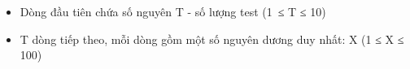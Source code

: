 \begin{itemize}
	\item     Dòng đầu tiên chứa số nguyên T - số lượng test (1 ≤ T ≤ 10)   
	\item     T dòng tiếp theo, mỗi dòng gồm một số nguyên dương duy nhất: X (1 ≤ X ≤ 100)   
\end{itemize}